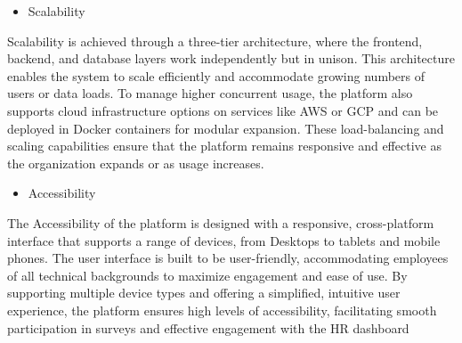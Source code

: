 \documentclass[conference]{IEEEtran}
\begin{document}
    \begin{itemize}
        \item Scalability
        \end{itemize}
    
    Scalability is achieved through a three-tier architecture, where the 
    frontend, backend, and database layers work independently but in 
    unison. This architecture enables the system to scale efficiently 
    and accommodate growing numbers of users or data loads. To manage 
    higher concurrent usage, the platform also supports cloud 
    infrastructure options on services like AWS or GCP and can be 
    deployed in Docker containers for modular expansion. These 
    load-balancing and scaling capabilities ensure that the platform 
    remains responsive and effective as the organization expands or as 
    usage increases.
    \newline    

    \begin{itemize}
        \item Accessibility
        \end{itemize}

    The Accessibility of the platform is designed with a responsive, 
    cross-platform interface that supports a range of devices, from 
    Desktops to tablets and mobile phones. The user interface is built 
    to be user-friendly, accommodating employees of all technical 
    backgrounds to maximize engagement and ease of use. By supporting 
    multiple device types and offering a simplified, intuitive user 
    experience, the platform ensures high levels of accessibility, 
    facilitating smooth participation in surveys and effective 
    engagement with the HR dashboard
     
    
    
\end{document}
